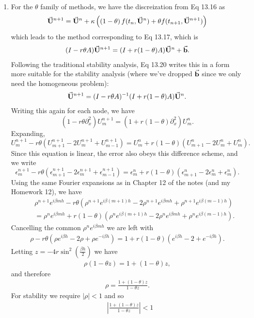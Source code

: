 \documentclass[11pt]{article}
\def\f{\frac }
\newcommand{\bvec}[1]{\vec{ {\bf #1 } }}
\begin{document}
\begin{enumerate}
\item For the $\theta$ family of methods, we have the discreization from Eq 13.16 as
\[ \bvec{U}^{n+1} = \bvec{U}^{n} + \kappa \left ( \left ( 1-\theta \right ) f(t_n, \bvec{U}^n ) + \theta f(t _{n+1},\bvec{U}^{n+1} ) \right ) \]
which leads to the method corresponding to Eq 13.17, which is
\[ (I-r\theta A) \bvec{U}^{n+1} = (I +r (1-\theta) A)\bvec{U}^n + \bvec{b}.\]
Following the traditional stability analysis, Eq 13.20 writes this in a form more suitable for the stability analysis (where we've dropped $\bvec{b}$ since we only need the homogeneous problem):
\[ \bvec{U}^{n+1} = (I-r\theta A) ^{-1} (I +r (1-\theta) A)\bvec{U}^n .\]
Writing this again for each node, we have
\[ (1-r\theta \partial _x ^2 ) U^{n+1} _m  =  (1 +r (1-\theta) \partial _x ^2 )U^n_m  .\]
Expanding,
\[ U^{n+1} _m-r\theta (U^{n+1} _{m+1} -2U^{n+1} _m + U^{n+1} _{m-1} )  =   U^n_{m}+r (1-\theta) (U^n_{m+1}-2U^n_{m}+U^n_{m})  .\]
Since this equation is linear, the error also obeys this difference scheme, and we write
\[ \epsilon^{n+1} _m-r\theta (\epsilon^{n+1} _{m+1} -2\epsilon^{n+1} _m + \epsilon^{n+1} _{m-1} )  =   \epsilon^n_{m}+r (1-\theta) (\epsilon^n_{m+1}-2\epsilon^n_{m}+\epsilon^n_{m})  .\]
Using the same Fourier expansions as in Chapter 12 of the notes (and my Homework 12), we have
\begin{align*} &\rho^{n+1} e^{i \beta m h}-r\theta (\rho ^{n+1} e^{i \beta (m+1) h} -2\rho ^{n+1} e^{i \beta m h}+ \rho ^{n+1} e^{i \beta (m-1) h} )\\  ~~~~~~&=   \rho ^{n} e^{i \beta m h}+r (1-\theta) (\rho ^{n} e^{i \beta (m+1) h}-2\rho ^{n} e^{i \beta m h}+\rho ^{n} e^{i \beta (m-1) h})  .\end{align*}
Cancelling the common $\rho ^n e^{i\beta mh}$ we are left with
\begin{align*} \rho -r\theta (\rho e^{i \beta h} -2\rho + \rho e^{-i \beta h} ) =   1+r (1-\theta) (e^{i \beta h}-2+ e^{-i \beta h})  .\end{align*}
Letting $z = -4r \sin ^2 \left ( \f{\beta h }{2} \right )$ we have
\begin{align*} \rho (1-\theta z) =   1+ (1-\theta) z, \end{align*}
and therefore
\begin{align*} \rho  =  \f{ 1+ (1-\theta) z} {1-\theta z}. \end{align*}
For stability we require $|\rho| < 1$ and so 
\begin{align*} &\left | \f{ 1+ (1-\theta) z} {1-\theta z} \right | < 1\\

\end{align*}
\end{enumerate}
\end{document}
